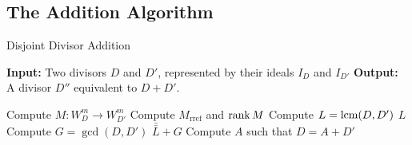 
\subsection{The Addition Algorithm}

\begin{center}
  \begin{algorithm}
    \caption{Disjoint Divisor Addition}
    {\bf Input:} Two divisors $D$ and $D'$, represented by their ideals $I_D$ and $I_{D'}$
    {\bf Output:} A divisor $D''$ equivalent to $D + D'$.
    \begin{algorithmic}[1]
      \State Compute $M : W_D^m \to W_{D'}^m$
      \State Compute $M_{\text{rref}}$ and $\operatorname{rank} M$
      \State Compute $L = \operatorname{lcm}(D, D')$
        \State \Return $L$
      \EndIf
        \State Compute $G = \gcd(D, D')$
        \State \Return $\bar{\bar L} + G$
      \EndIf
          \State Compute $A$ such that $D = A + D'$
        \EndIf
      \EndIf
    \end{algorithmic}
  \end{algorithm}
\end{center}
